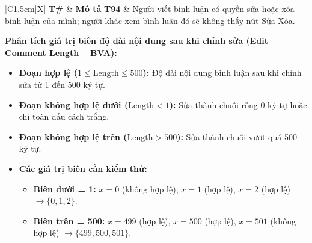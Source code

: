 \documentclass[11pt,a4paper]{article}
\begin{document}
\begin{table}[H]
\centering
\small
\begin{tabularx}{\textwidth}{|C{1.5cm}|X|}
\hline
{}
\textbf{T\#} & \textbf{Mô tả} \tabularnewline
\hline
\textbf{T94} & Người viết bình luận có quyền sửa hoặc xóa bình luận của mình; người khác xem bình luận đó sẽ không thấy nút Sửa Xóa. \\ \hline
\end{tabularx}
\caption{Bảng mã yêu cầu kỹ thuật chức năng chỉnh sửa bình luận (B6)}
\end{table}

\noindent\textbf{Phân tích giá trị biên độ dài nội dung sau khi chỉnh sửa (Edit Comment Length -- BVA):}
\begin{center}
\end{center}

\begin{itemize}[leftmargin=1.2cm, noitemsep]
    \item[\textbf{--}] \textbf{Đoạn hợp lệ ($1 \le \text{Length} \le 500$):} Độ dài nội dung bình luận sau khi chỉnh sửa từ 1 đến 500 ký tự.
    \item[\textbf{--}] \textbf{Đoạn không hợp lệ dưới ($\text{Length} < 1$):} Sửa thành chuỗi rỗng 0 ký tự hoặc chỉ toàn dấu cách trắng.
    \item[\textbf{--}] \textbf{Đoạn không hợp lệ trên ($\text{Length} > 500$):} Sửa thành chuỗi vượt quá 500 ký tự.
    \item[\textbf{--}] \textbf{Các giá trị biên cần kiểm thử:}
    \begin{itemize}[leftmargin=0.8cm, label=$\bullet$, noitemsep]
        \item \textbf{Biên dưới = 1:} $x = 0$ (không hợp lệ), $x = 1$ (hợp lệ), $x = 2$ (hợp lệ) $\rightarrow \{0, 1, 2\}$.
        \item \textbf{Biên trên = 500:} $x = 499$ (hợp lệ), $x = 500$ (hợp lệ), $x = 501$ (không hợp lệ) $\rightarrow \{499, 500, 501\}$.
    \end{itemize}
\end{itemize}
\end{document}
